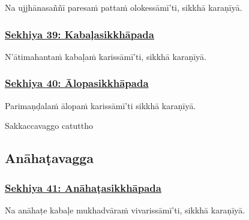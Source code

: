 Na ujjhānasaññī paresaṁ pattaṁ olokessāmī'ti, sikkhā karaṇīyā.



\subsubsection*{\hyperref[training39]{Sekhiya 39: Kabaḷasikkhāpada}}
\label{sekh39}

N'ātimahantaṁ kabaḷaṁ\makeatletter\hyperlink{endnote492-appendix}\makeatother{} karissāmī'ti, sikkhā karaṇīyā.



\subsubsection*{\hyperref[training40]{Sekhiya 40: Ālopasikkhāpada}}
\label{sekh40}

Parimaṇḍalaṁ ālopaṁ karissāmī'ti sikkhā karaṇīyā.

\begin{center}
	Sakkaccavaggo catuttho\makeatletter\hyperlink{endnote493-appendix}\makeatother{}
\end{center}



\subsection{Anāhaṭavagga}
\label{sekh-vagga5}

\subsubsection*{\hyperref[training41]{Sekhiya 41: Anāhaṭasikkhāpada}}
\label{sekh41}

Na anāhaṭe\makeatletter\hyperlink{endnote494-appendix}\makeatother{} kabaḷe\makeatletter\hyperlink{endnote495-appendix}\makeatother{} mukhadvāraṁ vivarissāmī'ti, sikkhā karaṇīyā.



